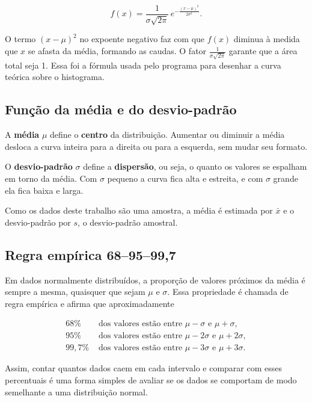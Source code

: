 \documentclass[12pt,a4paper]{article}
\begin{document}
\begin{equation}\label{eq:densidade}
  f(x) = \frac{1}{\sigma\sqrt{2\pi}} \, e^{-\frac{(x-\mu)^2}{2\sigma^2}} .
\end{equation}

O termo $(x-\mu)^2$ no expoente negativo faz com que $f(x)$ diminua à medida que $x$ se afasta da média, formando as caudas. O fator $\frac{1}{\sigma\sqrt{2\pi}}$ garante que a área total seja 1. Essa foi a fórmula usada pelo programa para desenhar a curva teórica sobre o histograma.

\subsection{Função da média e do desvio-padrão}

A \textbf{média} $\mu$ define o \textbf{centro} da distribuição. Aumentar ou diminuir a média desloca a curva inteira para a direita ou para a esquerda, sem mudar seu formato.

O \textbf{desvio-padrão} $\sigma$ define a \textbf{dispersão}, ou seja, o quanto os valores se espalham em torno da média. Com $\sigma$ pequeno a curva fica alta e estreita, e com $\sigma$ grande ela fica baixa e larga.

Como os dados deste trabalho são uma amostra, a média é estimada por $\bar{x}$ e o desvio-padrão por $s$, o desvio-padrão amostral.

\subsection{Regra empírica 68--95--99,7}

Em dados normalmente distribuídos, a proporção de valores próximos da média é sempre a mesma, quaisquer que sejam $\mu$ e $\sigma$. Essa propriedade é chamada de regra empírica e afirma que aproximadamente

\begin{align*}
  68\%   &\text{ dos valores estão entre } \mu - \sigma  \text{ e } \mu + \sigma,\\
  95\%   &\text{ dos valores estão entre } \mu - 2\sigma \text{ e } \mu + 2\sigma,\\
  99{,}7\% &\text{ dos valores estão entre } \mu - 3\sigma \text{ e } \mu + 3\sigma.
\end{align*}

Assim, contar quantos dados caem em cada intervalo e comparar com esses percentuais é uma forma simples de avaliar se os dados se comportam de modo semelhante a uma distribuição normal.
\end{document}

